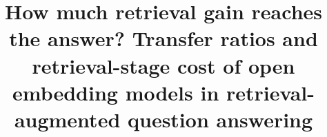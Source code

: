 \documentclass[a4paper,fleqn]{cas-sc}
\begin{document}
\let\WriteBookmarks\relax
\def\floatpagepagefraction{1}
\def\textpagefraction{.001}


\title[mode=title]{How much retrieval gain reaches the answer? Transfer ratios and retrieval-stage cost of open embedding models in retrieval-augmented question answering}



\maketitle















\appendix

\end{document}
